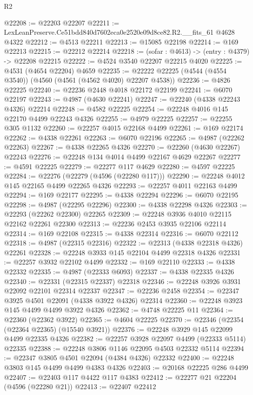 \begin{lexlean}{R2}
\begin{coremodule}
@22208 := @22203 @22207
@22211 := LexLeanPreserve.Ce51bdd840d7602eca0e2520e09d8ce82.R2.__fits_61 @4628 @4322
@22212 := @4513 @22211
@22213 := @15085 @22198
@22214 := @169 @22213
@22215 := @22212 @22214
@22218 := (sofar : @4613) -> (entry : @4379) -> @22208 @22215
@22222 := @4524 @3540 @22207 @22215 @4020
@22225 := @4531 (@4654 @22204) @4659
@22235 := @22222 @22225 (@4544 (@4554 @3540)) (@4560 (@4561 (@4562 @4020) @22207 @4538))
@22236 := @4826 @22225
@22240 := @22236 @2448 @4018 @22172 @22199
@22241 := @6070 @22197
@22243 := @4987 (@4630 @22241)
@22247 := @22240 (@4338 @22243 @4326) @22214
@22248 := @4582 @22225
@22254 := @22248 @4016 @145 @22170 @4499 @22243 @4326
@22255 := @4979 @22225
@22257 := @22255 @305 @1132
@22260 := @22257 @4015 @22168 @4499
@22261 := @169 @22174
@22262 := @4338 @22261
@22263 := @6070 @22196
@22265 := @4987 (@22262 @22263)
@22267 := @4338 @22265 @4326
@22270 := @22260 (@4630 @22267) @22243
@22276 := @22248 @134 @4014 @4499 @22167 @4629 @22267
@22277 := @4591 @22225
@22279 := @22277 @117 @4629
@22280 := @4597 @22225
@22284 := @22276 (@22279 (@4596 (@22280 @117)))
@22290 := @22248 @4012 @145 @22165 @4499 @22265 @4326
@22293 := @22257 @4011 @22163 @4499
@22294 := @169 @22177
@22295 := @4338 @22294
@22296 := @6070 @22195
@22298 := @4987 (@22295 @22296)
@22300 := @4338 @22298 @4326
@22303 := @22293 (@22262 @22300) @22265
@22309 := @22248 @3936 @4010 @22115 @22162 @22261 @22300
@22313 := @22236 @2453 @3935 @22106 @22114
@22314 := @169 @22108
@22315 := @4338 @22314
@22316 := @6070 @22112
@22318 := @4987 (@22315 @22316)
@22322 := @22313 (@4338 @22318 @4326) @22261
@22328 := @22248 @3933 @145 @22104 @4499 @22318 @4326
@22331 := @22257 @3932 @22102 @4499
@22332 := @169 @22110
@22333 := @4338 @22332
@22335 := @4987 (@22333 @6093)
@22337 := @4338 @22335 @4326
@22340 := @22331 (@22315 @22337) @22318
@22346 := @22248 @3926 @3931 @22092 @22101 @22314 @22337
@22347 := @22236 @2458
@22354 := @22347 @3925 @4501 @22091 (@4338 @3922 @4326) @22314
@22360 := @22248 @3923 @145 @4499 @4499 @3922 @4326
@22362 := @4748 @22225 @11
@22364 := @22360 (@22362 @3922)
@22365 := @4604 @22225
@22370 := @22346 (@22354 (@22364 @22365) (@15540 @3921))
@22376 := @22248 @3929 @145 @22099 @4499 @22335 @4326
@22382 := @22257 @3928 @22097 @4499 (@22333 @5114) @22335
@22388 := @22248 @3806 @1146 @22095 @4503 @22332 @5114
@22394 := @22347 @3805 @4501 @22094 (@4384 @4326) @22332
@22400 := @22248 @3803 @145 @4499 @4499 @4383 @4326
@22403 := @20168 @22225 @286 @4499
@22407 := @22403 @117 @4422 @117 @4383
@22412 := @22277 @21 @22204 (@4596 (@22280 @21))
@22413 := @22407 @22412

\end{coremodule}
\end{lexlean}
